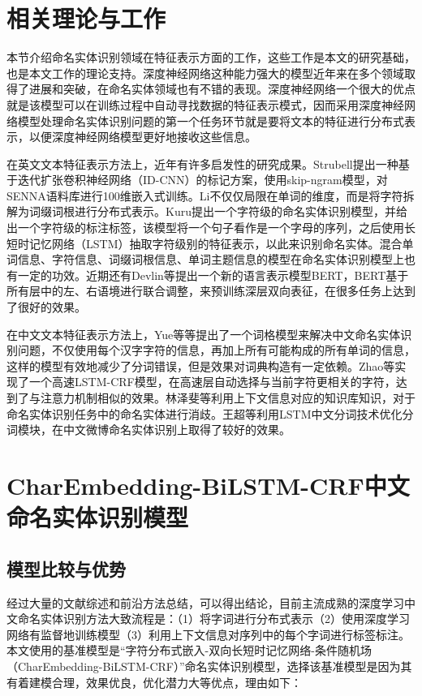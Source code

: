 \documentclass[winfonts,master,oneside,nobackinfo]{njuthesis}
\begin{document}
\section{相关理论与工作}

本节介绍命名实体识别领域在特征表示方面的工作，这些工作是本文的研究基础，也是本文工作的理论支持。深度神经网络这种能力强大的模型近年来在多个领域取得了进展和突破，在命名实体领域也有不错的表现。深度神经网络一个很大的优点就是该模型可以在训练过程中自动寻找数据的特征表示模式，因而采用深度神经网络模型处理命名实体识别问题的第一个任务环节就是要将文本的特征进行分布式表示，以便深度神经网络模型更好地接收这些信息。

在英文文本特征表示方法上，近年有许多启发性的研究成果。Strubell\cite{Strubell}提出一种基于迭代扩张卷积神经网络（ID-CNN）的标记方案，使用skip-ngram模型，对SENNA语料库进行100维嵌入式训练。Li\cite{JLi}不仅仅局限在单词的维度，而是将字符拆解为词缀词根进行分布式表示。Kuru\cite{Kuru}提出一个字符级的命名实体识别模型，并给出一个字符级的标注标签，该模型将一个句子看作是一个字母的序列，之后使用长短时记忆网络（LSTM）抽取字符级别的特征表示，以此来识别命名实体。混合单词信息、字符信息、词缀词根信息、单词主题信息的模型\cite{Strubell,Jansson,Wei}在命名实体识别模型上也有一定的功效。近期还有Devlin等\cite{Devlin}提出一个新的语言表示模型BERT，BERT基于所有层中的左、右语境进行联合调整，来预训练深层双向表征，在很多任务上达到了很好的效果。

在中文文本特征表示方法上，Yue等\cite{Yue}等提出了一个词格模型来解决中文命名实体识别问题，不仅使用每个汉字字符的信息，再加上所有可能构成的所有单词的信息，这样的模型有效地减少了分词错误，但是效果对词典构造有一定依赖。Zhao等\cite{Zhao}实现了一个高速LSTM-CRF模型，在高速层自动选择与当前字符更相关的字符，达到了与注意力机制相似的效果。林泽斐等\cite{lzf}利用上下文信息对应的知识库知识，对于命名实体识别任务中的命名实体进行消歧。王超等\cite{Wang}利用LSTM中文分词技术优化分词模块，在中文微博命名实体识别上取得了较好的效果。

\section{CharEmbedding-BiLSTM-CRF中文命名实体识别模型}

\subsection{模型比较与优势}
经过大量的文献综述和前沿方法总结，可以得出结论，目前主流成熟的深度学习中文命名实体识别方法大致流程是：（1）将字词进行分布式表示（2）使用深度学习网络有监督地训练模型（3）利用上下文信息对序列中的每个字词进行标签标注。本文使用的基准模型是“字符分布式嵌入-双向长短时记忆网络-条件随机场（CharEmbedding-BiLSTM-CRF）”命名实体识别模型，选择该基准模型是因为其有着建模合理，效果优良，优化潜力大等优点，理由如下：
\end{document}
